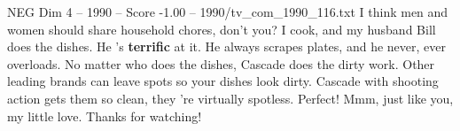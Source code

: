 \begin{textsample}{NEG Dim 4 – 1990 – Score -1.00 – 1990/tv\_com\_1990\_116.txt}  \label{ex:f4_neg_072}
I think men and women should share household chores, don't you?
I cook, and my husband Bill does the dishes.
He 's \textbf{terrific} at it.
He always scrapes plates, and he never, ever overloads.
No matter who does the dishes, Cascade does the dirty work.
Other leading brands can leave spots so your dishes look dirty.
Cascade with shooting action gets them so clean, they 're virtually spotless.
Perfect!
Mmm, just like you, my little love.
Thanks for watching!

\end{textsample}
